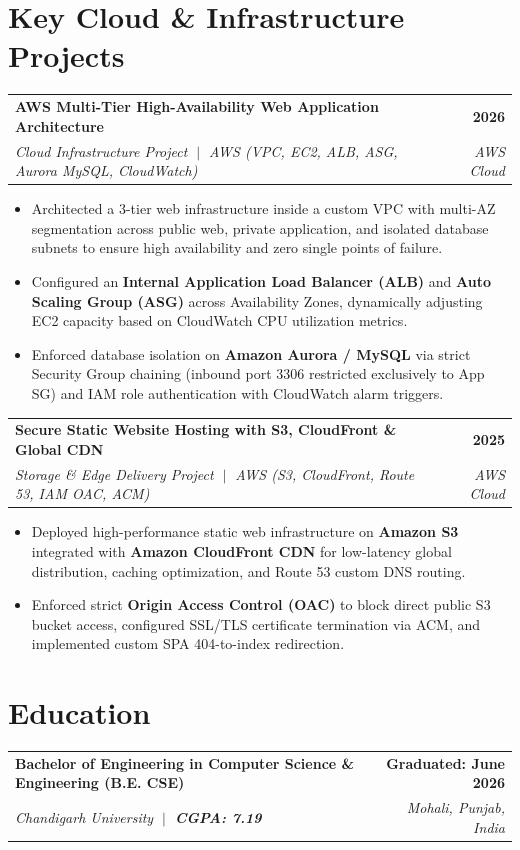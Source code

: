 \documentclass[letterpaper,9.8pt]{article}
\makeatletter
\newcommand{\resumeItemListStart}{\begin{itemize}[leftmargin=0.18in, labelsep=0.06in, itemsep=0.8pt, topsep=0.5pt, parsep=0pt, partopsep=0pt]}
\newcommand{\resumeItemListEnd}{\end{itemize}\vspace{2pt}}
\newcommand{\resumeProjectHeader}[4]{
  \vspace{1pt}
  \begin{tabular*}{1.0\textwidth}[t]{l@{\extracolsep{\fill}}r}
    \textbf{#1} & \textbf{\small #2} \\
    \textit{\small #3} & \textit{\small #4} \\
  \end{tabular*}\vspace{-3.5pt}
}
\newcommand{\resumeEduHeader}[4]{
  \vspace{1pt}
  \begin{tabular*}{1.0\textwidth}[t]{l@{\extracolsep{\fill}}r}
    \textbf{#1} & \textbf{\small #2} \\
    \textit{\small #3} & \textit{\small #4} \\
  \end{tabular*}\vspace{-3pt}
}
\makeatother
\begin{document}
\section{Key Cloud \& Infrastructure Projects}
\resumeProjectHeader{AWS Multi-Tier High-Availability Web Application Architecture}{2026}{Cloud Infrastructure Project $\;\vert\;$ AWS (VPC, EC2, ALB, ASG, Aurora MySQL, CloudWatch)}{AWS Cloud}
\resumeItemListStart
  \item \small{Architected a 3-tier web infrastructure inside a custom VPC with multi-AZ segmentation across public web, private application, and isolated database subnets to ensure high availability and zero single points of failure.}
  \item \small{Configured an \textbf{Internal Application Load Balancer (ALB)} and \textbf{Auto Scaling Group (ASG)} across Availability Zones, dynamically adjusting EC2 capacity based on CloudWatch CPU utilization metrics.}
  \item \small{Enforced database isolation on \textbf{Amazon Aurora / MySQL} via strict Security Group chaining (inbound port 3306 restricted exclusively to App SG) and IAM role authentication with CloudWatch alarm triggers.}
\resumeItemListEnd

\resumeProjectHeader{Secure Static Website Hosting with S3, CloudFront \& Global CDN}{2025}{Storage \& Edge Delivery Project $\;\vert\;$ AWS (S3, CloudFront, Route 53, IAM OAC, ACM)}{AWS Cloud}
\resumeItemListStart
  \item \small{Deployed high-performance static web infrastructure on \textbf{Amazon S3} integrated with \textbf{Amazon CloudFront CDN} for low-latency global distribution, caching optimization, and Route 53 custom DNS routing.}
  \item \small{Enforced strict \textbf{Origin Access Control (OAC)} to block direct public S3 bucket access, configured SSL/TLS certificate termination via ACM, and implemented custom SPA 404-to-index redirection.}
\resumeItemListEnd

\section{Education}
\resumeEduHeader{Bachelor of Engineering in Computer Science \& Engineering (B.E. CSE)}{Graduated: June 2026}{Chandigarh University $\;\vert\;$ \textbf{CGPA: 7.19}}{Mohali, Punjab, India}
\end{document}
